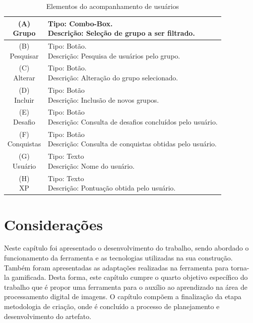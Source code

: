 \documentclass[
	12pt,				%
	oneside,			%
	a4paper,			%
	english,			%
	french,				%
	spanish,			%
	brazil,				%
	]{abntex2}
\begin{document}
\begin{longtable}{|c|l|}
 \caption{Elementos do acompanhamento de usuários} \label{tab:visnodeUsuarios} \\
  \hline
  \makecell{(A) \\ Grupo} 
  &
  \makecell[l]{Tipo: Combo-Box.\\ Descrição: Seleção de grupo a ser filtrado.} \\
  \hline
  \makecell{(B) \\ Pesquisar} 
  &
  \makecell[l]{Tipo: Botão.\\ Descrição: Pesquisa de usuários pelo grupo.} \\
  \hline
  \makecell{(C) \\ Alterar} 
  &
  \makecell[l]{Tipo: Botão. \\ Descrição: Alteração do grupo selecionado.} \\
  \hline
  \makecell{(D) \\ Incluir} 
  &
  \makecell[l]{Tipo: Botão\\ Descrição: Inclusão de novos grupos.} \\
  \hline
  \makecell{(E) \\ Desafio} 
  &
  \makecell[l]{Tipo: Botão\\ Descrição: Consulta de desafios concluídos pelo usuário.} \\
  \hline  
  \makecell{(F) \\ Conquistas} 
  &
  \makecell[l]{Tipo: Botão\\ Descrição: Consulta de conquistas obtidas pelo usuário.} \\
  \hline    
  \makecell{(G) \\ Usuário} 
  &
  \makecell[l]{Tipo: Texto\\ Descrição: Nome do usuário.} \\
  \hline    
  \makecell{(H) \\ XP} 
  &
  \makecell[l]{Tipo: Texto\\ Descrição: Pontuação obtida pelo usuário.} \\
  \hline       
\end{longtable}

\section{Considerações}

Neste capítulo foi apresentado o desenvolvimento do trabalho, sendo abordado o funcionamento da ferramenta e as tecnologias utilizadas na sua construção. Também foram apresentadas as adaptações realizadas na ferramenta para torna-la gamificada. Desta forma, este capítulo cumpre o quarto objetivo específico do trabalho que é propor uma ferramenta para o auxílio ao aprendizado na área de processamento digital de imagens. O capítulo compõem a finalização da etapa metodologia de criação, onde é concluído a processo de planejamento e desenvolvimento do artefato.
\end{document}
